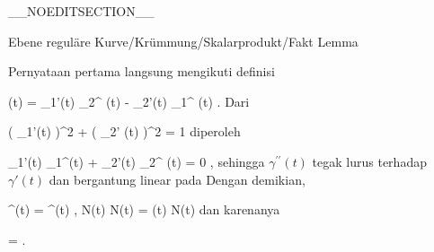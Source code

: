 __NOEDITSECTION__

{Ebene reguläre Kurve/Krümmung/Skalarprodukt/Fakt}
{Lemma}
{}
{

\faktzusatz {}
\faktzusatz {}

}
{

Pernyataan pertama langsung mengikuti definisi

\mavergleichskettedisp
{\vergleichskette
{ \kappa(t)
}
{ =} { \gamma_1'(t) \gamma_2^{\prime \prime} (t) - \gamma_2'(t) \gamma_1^{\prime \prime} (t)
}
{ } {
}
{ } {
}
{ } {
}
}
{}{}{.}
Dari

\mavergleichskettedisp
{\vergleichskette
{ \left(  \gamma_1'(t)  \right)^2 +  \left(  \gamma_2' (t)  \right)^2
}
{ =} { 1
}
{ } {
}
{ } {
}
{ } {
}
}
{}{}{}
diperoleh

\mavergleichskettedisp
{\vergleichskette
{ \gamma_1'(t) \gamma_1^{\prime \prime}(t) + \gamma_2'(t) \gamma_2^{\prime \prime} (t)
}
{ =} { 0
}
{ } {
}
{ } {
}
{ } {
}
}
{}{}{,}
sehingga $\gamma^{\prime \prime}(t)$ tegak lurus terhadap $\gamma'(t)$ dan bergantung linear pada
 Dengan demikian,

\mavergleichskettedisp
{\vergleichskette
{ \gamma^{\prime \prime}(t)
}
{ =} { \left\langle  \gamma^{\prime \prime}(t) ,  N(t)  \right\rangle  N(t)
}
{ =} { \kappa(t) N(t)
}
{ } {
}
{ } {
}
}
{}{}{}
dan karenanya

\mavergleichskettedisp
{\vergleichskette
{  \Vert
}
{ =} { 
}
{ } {
}
{ } {
}
{ } {
}
}
{}{}{.}

}

